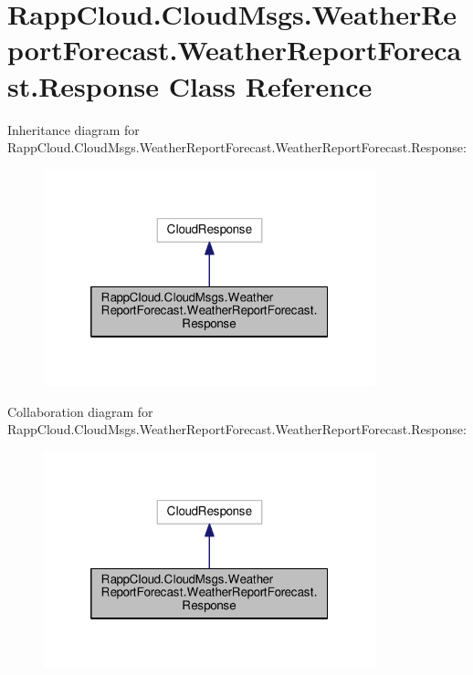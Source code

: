 \hypertarget{classRappCloud_1_1CloudMsgs_1_1WeatherReportForecast_1_1WeatherReportForecast_1_1Response}{\section{Rapp\-Cloud.\-Cloud\-Msgs.\-Weather\-Report\-Forecast.\-Weather\-Report\-Forecast.\-Response Class Reference}
\label{classRappCloud_1_1CloudMsgs_1_1WeatherReportForecast_1_1WeatherReportForecast_1_1Response}
}


Inheritance diagram for Rapp\-Cloud.\-Cloud\-Msgs.\-Weather\-Report\-Forecast.\-Weather\-Report\-Forecast.\-Response\-:
\nopagebreak
\begin{figure}[H]
\begin{center}
\leavevmode
\includegraphics[width=272pt]{classRappCloud_1_1CloudMsgs_1_1WeatherReportForecast_1_1WeatherReportForecast_1_1Response__inherit__graph}
\end{center}
\end{figure}


Collaboration diagram for Rapp\-Cloud.\-Cloud\-Msgs.\-Weather\-Report\-Forecast.\-Weather\-Report\-Forecast.\-Response\-:
\nopagebreak
\begin{figure}[H]
\begin{center}
\leavevmode
\includegraphics[width=272pt]{classRappCloud_1_1CloudMsgs_1_1WeatherReportForecast_1_1WeatherReportForecast_1_1Response__coll__graph}
\end{center}
\end{figure}
